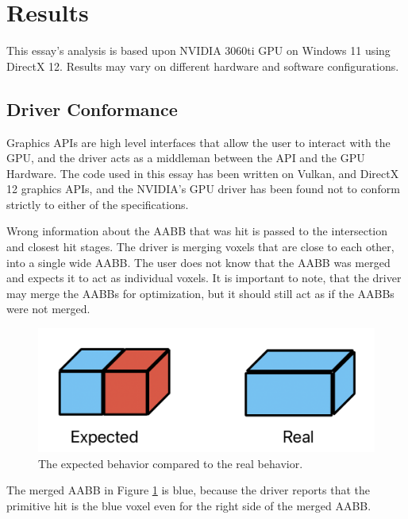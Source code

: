 \documentclass[12pt]{article}
\begin{document}
\section{Results}

This essay's analysis is based upon NVIDIA 3060ti GPU on Windows 11 using DirectX 12.
Results may vary on different hardware and software configurations.

\subsection{Driver Conformance}

Graphics APIs are high level interfaces that allow the user to interact with the GPU,
and the driver acts as a middleman between the API and the GPU Hardware.
The code used in this essay has been written on Vulkan, and DirectX 12 graphics APIs,
and the NVIDIA's GPU driver has been found not to conform strictly to either of the specifications.

Wrong information about the AABB that was hit is passed to the intersection and closest hit stages.
The driver is merging voxels that are close to each other, into a single wide AABB.
The user does not know that the AABB was merged and expects it to act as individual voxels.
It is important to note, that the driver may merge the AABBs for optimization, but it should still act as if the AABBs were not merged.

\begin{figure}[H]
    \begin{center}
        \includegraphics[scale=0.5]{Voxel-Merging}
    \end{center}
    \caption{
        The expected behavior compared to the real behavior.
        }
        \label{fig:Voxel-Merging}
\end{figure}
    
The merged AABB in Figure \ref{fig:Voxel-Merging} is blue,
because the driver reports that the primitive hit is the blue voxel even for the right side of the merged AABB.
\end{document}
